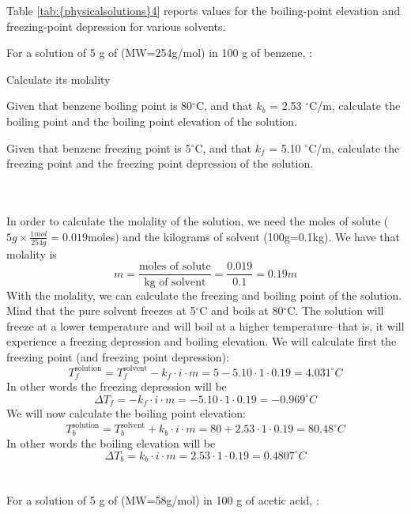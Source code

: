 \documentclass[main.tex]{subfiles}
\newcommand\chapterlabel{physicalsolutions}
\begin{document}
\begin{description}
\begin{center}
\begin{tabular}{lllll}
 \bottomrule
\end{tabular}\end{center} 
Table \ref{tab:{\chapterlabel}4} reports values for the boiling-point elevation and freezing-point depression for various solvents.

\begin{example} %
For a solution of 5 g of  (MW=254g/mol) in 100 g of benzene, :
\begin{inparaenum}[(a)]	
\item Calculate its molality %
\item	 Given that benzene boiling point is 80$^{\circ}$C, and that $k_b$ = 2.53 $^{\circ}$C/m, calculate the boiling point and the boiling point elevation of the solution.  
\item	 Given that benzene freezing point is 5$^{\circ}$C, and that $k_f$ = 5.10 $^{\circ}$C/m, calculate the freezing point and the freezing point depression of the solution.   
\end{inparaenum}
\\
 \\
In order to calculate the molality of the solution, we need the moles of solute ($5g\times \frac{1mol}{254g}=0.019$moles)  and the kilograms of solvent (100g=0.1kg). We have that molality is
\[m=\frac{\text{moles of solute}}{\text{kg of solvent}}=\frac{0.019}{0.1}=0.19m\]
With the molality, we can calculate the freezing and boiling point of the solution. Mind that the pure solvent freezes at 5$^{\circ}$C and boils at 80$^{\circ}$C. The solution will freeze at a lower temperature and will boil at a higher temperature--that is, it will experience a freezing depression and boiling elevation. We will calculate first the freezing point (and freezing point depression):
\[T_f^{\text{solution}}=T_f^{\text{solvent}}-k_f\cdot i\cdot m =5-5.10\cdot 1\cdot 0.19=4.031 ^{\circ} C\]
In other words the freezing depression will be
\[\Delta T_f =-k_f\cdot i\cdot m=-5.10\cdot 1\cdot 0.19=-0.969^{\circ}C\]
We will now calculate the boiling point elevation:
\[T_b^{\text{solution}}=T_b^{\text{solvent}}+k_b\cdot i\cdot m=80+2.53\cdot 1\cdot 0.19=80.48^{\circ}C\]
 In other words the boiling elevation will be
\[\Delta T_b =k_b\cdot i\cdot m=2.53\cdot 1\cdot 0.19=0.4807^{\circ}C \]
\\
\faDiamond\ \\
For a solution of 5 g of  (MW=58g/mol) in 100 g of acetic acid, :

\end{example}
\end{description}
\end{document}
